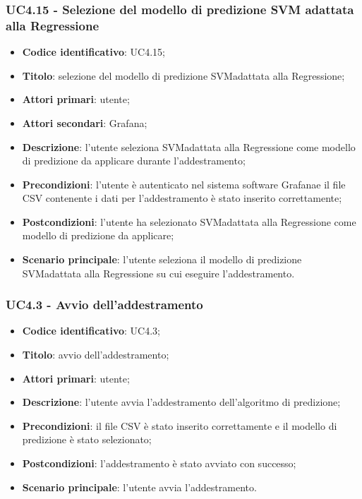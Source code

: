 \subsubsection{UC4.15 - Selezione del modello di predizione SVM adattata alla Regressione}
\begin{itemize}
	\item \textbf{Codice identificativo}: UC4.15;
	\item \textbf{Titolo}: selezione del modello di predizione SVM\glosp adattata alla Regressione;
	\item \textbf{Attori primari}: utente;
	\item \textbf{Attori secondari}: Grafana\glo;
	\item \textbf{Descrizione}: l'utente seleziona SVM\glosp adattata alla Regressione come modello di predizione da applicare durante l'addestramento;
	\item \textbf{Precondizioni}: l'utente è autenticato nel sistema software Grafana\glosp e il file CSV contenente i dati per l'addestramento è stato inserito correttamente;
	\item \textbf{Postcondizioni}: l'utente ha selezionato SVM\glosp adattata alla Regressione come modello di predizione da applicare;
	\item \textbf{Scenario principale}: l'utente seleziona il modello di predizione SVM\glosp adattata alla Regressione su cui eseguire l'addestramento.
\end{itemize}
\subsubsection{UC4.3 - Avvio dell'addestramento}
\begin{itemize}
    \item \textbf{Codice identificativo}: UC4.3;
    \item \textbf{Titolo}: avvio dell'addestramento;
    \item \textbf{Attori primari}: utente;
    \item \textbf{Descrizione}: l'utente avvia l'addestramento dell'algoritmo di predizione;
    \item \textbf{Precondizioni}: il file CSV è stato inserito correttamente e il modello di predizione è stato selezionato;
    \item \textbf{Postcondizioni}: l'addestramento è stato avviato con successo;
    \item \textbf{Scenario principale}: l'utente avvia l'addestramento.
\end{itemize}

